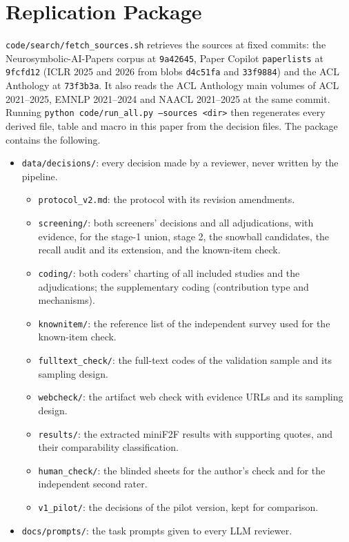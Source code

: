 \section{Replication Package}
\label{app:replication}
\texttt{code/search/fetch\_sources.sh} retrieves the sources at fixed commits: the Neurosymbolic-AI-Papers corpus at \texttt{9a42645}, Paper Copilot \texttt{paperlists} at \texttt{9fcfd12} (ICLR 2025 and 2026 from blobs \texttt{d4c51fa} and \texttt{33f9884}) and the ACL Anthology at \texttt{73f3b3a}. It also reads the ACL Anthology main volumes of ACL 2021--2025, EMNLP 2021--2024 and NAACL 2021--2025 at the same commit. Running \texttt{python code/run\_all.py --sources <dir>} then regenerates every derived file, table and macro in this paper from the decision files. The package contains the following.
\begin{itemize}
  \item \texttt{data/decisions/}: every decision made by a reviewer, never written by the pipeline.
  \begin{itemize}
    \item \texttt{protocol\_v2.md}: the protocol with its revision amendments.
    \item \texttt{screening/}: both screeners' decisions and all adjudications, with evidence, for the stage-1 union, stage 2, the snowball candidates, the recall audit and its extension, and the known-item check.
    \item \texttt{coding/}: both coders' charting of all included studies and the adjudications; the supplementary coding (contribution type and mechanisms).
    \item \texttt{knownitem/}: the reference list of the independent survey used for the known-item check.
    \item \texttt{fulltext\_check/}: the full-text codes of the validation sample and its sampling design.
    \item \texttt{webcheck/}: the artifact web check with evidence URLs and its sampling design.
    \item \texttt{results/}: the extracted miniF2F results with supporting quotes, and their comparability classification.
    \item \texttt{human\_check/}: the blinded sheets for the author's check and for the independent second rater.
    \item \texttt{v1\_pilot/}: the decisions of the pilot version, kept for comparison.
  \end{itemize}
  \item \texttt{docs/prompts/}: the task prompts given to every LLM reviewer.

\end{itemize}
